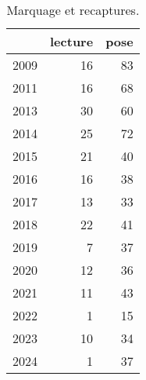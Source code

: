 \begin{table}[htbp]
\centering
\caption[Marquage et recaptures. Les marques sont soit posées, soit lues lorsque l'anguille est déjà marquée.]{Marquage et recaptures.} 
\label{tablemr}
\begin{tabular}{lrr}
  \hline
 & lecture & pose \\ 
  \hline
2009 & 16 & 83 \\ 
  2011 & 16 & 68 \\ 
  2013 & 30 & 60 \\ 
  2014 & 25 & 72 \\ 
  2015 & 21 & 40 \\ 
  2016 & 16 & 38 \\ 
  2017 & 13 & 33 \\ 
  2018 & 22 & 41 \\ 
  2019 & 7 & 37 \\ 
  2020 & 12 & 36 \\ 
  2021 & 11 & 43 \\ 
  2022 & 1 & 15 \\ 
  2023 & 10 & 34 \\ 
  2024 & 1 & 37 \\ 
   \hline
\end{tabular}
\end{table}
